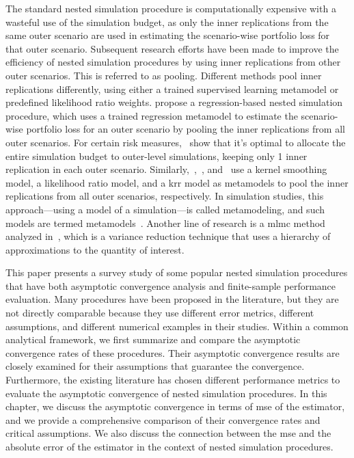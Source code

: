 The standard nested simulation procedure is computationally expensive with a wasteful use of the simulation budget, as only the inner replications from the same outer scenario are used in estimating the scenario-wise portfolio loss for that outer scenario.
Subsequent research efforts have been made to improve the efficiency of nested simulation procedures by using inner replications from other outer scenarios.
This is referred to as pooling.
Different methods pool inner replications differently, using either a trained supervised learning metamodel or predefined likelihood ratio weights.
\cite{broadie2015risk} propose a regression-based nested simulation procedure, which uses a trained regression metamodel to estimate the scenario-wise portfolio loss for an outer scenario by pooling the inner replications from all outer scenarios.
For certain risk measures,~\cite{broadie2015risk} show that it's optimal to allocate the entire simulation budget to outer-level simulations, keeping only 1 inner replication in each outer scenario.
Similarly,~\cite{hong2017kernel},~\cite{feng2020optimal}, and~\cite{zhang2022sample} use a kernel smoothing model, a likelihood ratio model, and a \gls{krr} model as metamodels to pool the inner replications from all outer scenarios, respectively.
In simulation studies, this approach—using a model of a simulation—is called metamodeling, and such models are termed metamodels~\citep{barton1998simulation}.
Another line of research is a \gls{mlmc} method analyzed in~\cite{giles2019multilevel}, which is a variance reduction technique that uses a hierarchy of approximations to the quantity of interest.

This paper presents a survey study of some popular nested simulation procedures that have both asymptotic convergence analysis and finite-sample performance evaluation.
Many procedures have been proposed in the literature, but they are not directly comparable because they use different error metrics, different assumptions, and different numerical examples in their studies.
Within a common analytical framework, we first summarize and compare the asymptotic convergence rates of these procedures.
Their asymptotic convergence results are closely examined for their assumptions that guarantee the convergence.
Furthermore, the existing literature has chosen different performance metrics to evaluate the asymptotic convergence of nested simulation procedures.
In this chapter, we discuss the asymptotic convergence in terms of \gls{mse} of the estimator, and we provide a comprehensive comparison of their convergence rates and critical assumptions.
We also discuss the connection between the \gls{mse} and the absolute error of the estimator in the context of nested simulation procedures.


